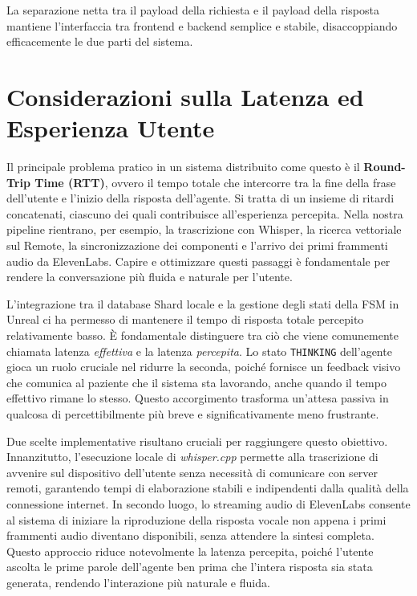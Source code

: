 La separazione netta tra il payload della richiesta  e il payload della risposta mantiene l'interfaccia tra frontend e backend semplice e stabile, disaccoppiando efficacemente le due parti del sistema.

\section{Considerazioni sulla Latenza ed Esperienza Utente}

Il principale problema pratico in un sistema distribuito come questo è il \textbf{Round-Trip Time (RTT)}, ovvero il tempo totale che intercorre tra la fine della frase dell'utente e l'inizio della risposta dell'agente. Si tratta di un insieme di ritardi concatenati, ciascuno dei quali contribuisce all'esperienza percepita. Nella nostra pipeline rientrano, per esempio, la trascrizione con Whisper, la ricerca vettoriale sul Remote, la sincronizzazione dei componenti e l'arrivo dei primi frammenti audio da ElevenLabs. Capire e ottimizzare questi passaggi è fondamentale per rendere la conversazione più fluida e naturale per l'utente.

L'integrazione tra il database Shard locale e la gestione degli stati della FSM in Unreal ci ha permesso di mantenere il tempo di risposta totale percepito relativamente basso. È fondamentale distinguere tra ciò che viene comunemente chiamata latenza \textit{effettiva} e la latenza \textit{percepita}. Lo stato \texttt{THINKING} dell'agente gioca un ruolo cruciale nel ridurre la seconda, poiché fornisce un feedback visivo che comunica al paziente che il sistema sta lavorando, anche quando il tempo effettivo rimane lo stesso. Questo accorgimento trasforma un'attesa passiva in qualcosa di percettibilmente più breve e significativamente meno frustrante.

Due scelte implementative risultano cruciali per raggiungere questo obiettivo. Innanzitutto, l'esecuzione locale di \textit{whisper.cpp} permette alla trascrizione di avvenire sul dispositivo dell'utente senza necessità di comunicare con server remoti, garantendo tempi di elaborazione stabili e indipendenti dalla qualità della connessione internet. In secondo luogo, lo streaming audio di ElevenLabs consente al sistema di iniziare la riproduzione della risposta vocale non appena i primi frammenti audio diventano disponibili, senza attendere la sintesi completa. Questo approccio riduce notevolmente la latenza percepita, poiché l'utente ascolta le prime parole dell'agente ben prima che l'intera risposta sia stata generata, rendendo l'interazione più naturale e fluida.